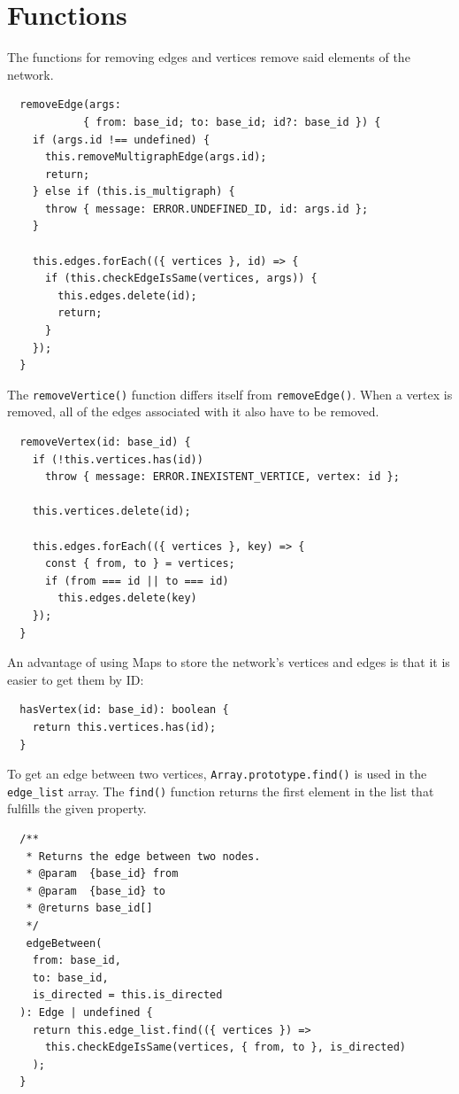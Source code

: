 \chapter{Functions}

The functions for removing edges and vertices remove said elements of the network.

\begin{verbatim}
  removeEdge(args:
            { from: base_id; to: base_id; id?: base_id }) {
    if (args.id !== undefined) {
      this.removeMultigraphEdge(args.id);
      return;
    } else if (this.is_multigraph) {
      throw { message: ERROR.UNDEFINED_ID, id: args.id };
    }

    this.edges.forEach(({ vertices }, id) => {
      if (this.checkEdgeIsSame(vertices, args)) {
        this.edges.delete(id);
        return;
      }
    });
  }
\end{verbatim}

The \texttt{removeVertice()} function differs itself from \texttt{removeEdge()}.
When a vertex is removed, all of the edges associated with it also have to be removed.

\begin{verbatim}
  removeVertex(id: base_id) {
    if (!this.vertices.has(id))
      throw { message: ERROR.INEXISTENT_VERTICE, vertex: id };

    this.vertices.delete(id);

    this.edges.forEach(({ vertices }, key) => {
      const { from, to } = vertices;
      if (from === id || to === id)
        this.edges.delete(key)
    });
  }
\end{verbatim}

An advantage of using Maps to store the network's vertices and edges is that it is easier to get
them by ID:

\begin{verbatim}
  hasVertex(id: base_id): boolean {
    return this.vertices.has(id);
  }
\end{verbatim}

To get an edge between two vertices, \texttt{Array.prototype.find()}
is used in the \texttt{edge_list} array.
The \texttt{find()}
function returns the first element in the list that fulfills the given property.

\begin{verbatim}
  /**
   * Returns the edge between two nodes.
   * @param  {base_id} from
   * @param  {base_id} to
   * @returns base_id[]
   */
   edgeBetween(
    from: base_id,
    to: base_id,
    is_directed = this.is_directed
  ): Edge | undefined {
    return this.edge_list.find(({ vertices }) =>
      this.checkEdgeIsSame(vertices, { from, to }, is_directed)
    );
  }
\end{verbatim}

